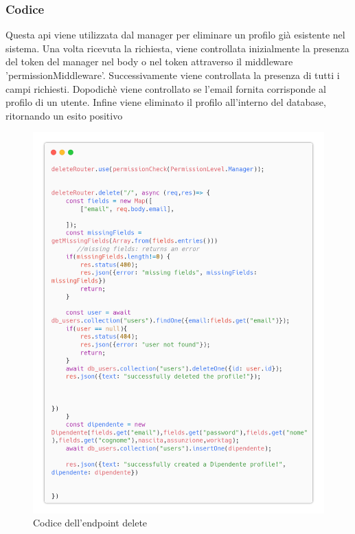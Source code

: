 \documentclass{report}
\begin{document}
\subsubsection*{Codice}
Questa api viene utilizzata dal manager per eliminare un profilo già esistente nel sistema.
Una volta ricevuta la richiesta, viene controllata inizialmente la presenza del token del manager nel body o nel token attraverso il middleware 'permissionMiddleware'.
Successivamente viene controllata la presenza di tutti i campi richiesti.
Dopodichè viene controllato se l'email fornita corrisponde al profilo di un utente.
Infine viene eliminato il profilo all'interno del database, ritornando un esito positivo
\begin{figure}[H]
	\centering\includegraphics[width=1\textwidth]{images/microservizio-dipendenti/delete-carbon.png}
	\caption{Codice dell'endpoint delete}
\end{figure}
\end{document}

